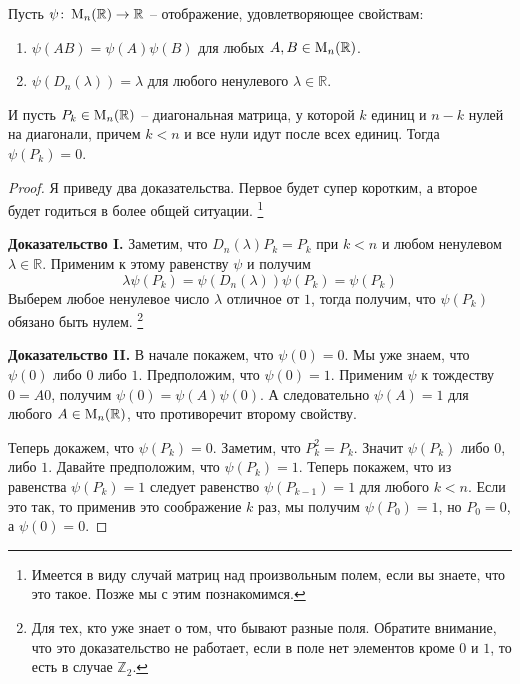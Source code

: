 \begin{claim}
\label{claim::MultiOnIdempotent}
Пусть $\psi\colon \operatorname{M}_{n}(\mathbb R)\to \mathbb R$ -- отображение, удовлетворяющее свойствам:
\begin{enumerate}
\item $\psi(AB) = \psi(A)\psi(B)$ для любых $A,B\in\operatorname{M}_{n}(\mathbb R)$.

\item $\psi(D_n(\lambda)) = \lambda$ для любого ненулевого $\lambda\in\mathbb R$.
\end{enumerate}
И пусть $P_k\in\operatorname{M}_{n}(\mathbb R)$ -- диагональная матрица, у которой $k$ единиц и $n-k$ нулей на диагонали, причем $k<n$ и все нули идут после всех единиц.
Тогда $\psi(P_k) = 0$.
\end{claim}
\begin{proof}
Я приведу два доказательства.
Первое будет супер коротким, а второе будет годиться в более общей ситуации.%
\footnote{Имеется в виду случай матриц над произвольным полем, если вы знаете, что это такое.
Позже мы с этим познакомимся.}

\noindent\textbf{Доказательство I.} Заметим, что $D_n(\lambda) P_k = P_k$ при $k < n$ и любом ненулевом $\lambda \in \mathbb R$.
Применим к этому равенству $\psi$ и получим
\[
\lambda \psi(P_k) = \psi(D_n(\lambda)) \psi(P_k) = \psi(P_k)
\]
Выберем любое ненулевое число $\lambda$ отличное от $1$, тогда получим, что $\psi(P_k)$ обязано быть нулем.%
\footnote{Для тех, кто уже знает о том, что бывают разные поля.
Обратите внимание, что это доказательство не работает, если в поле нет элементов кроме $0$ и $1$, то есть в случае $\mathbb Z_2$.}


\noindent\textbf{Доказательство II.} В начале покажем, что $\psi(0) = 0$.
Мы уже знаем, что $\psi(0)$ либо $0$ либо $1$.
Предположим, что $\psi(0)=1$.
Применим $\psi$ к тождеству $0 = A 0$, получим $\psi(0) = \psi(A)\psi(0)$.
А следовательно $\psi(A) = 1$ для любого $A\in\operatorname{M}_{n}(\mathbb R)$, что противоречит второму свойству.

Теперь докажем, что $\psi(P_k) = 0$.
Заметим, что $P_k^2 = P_k$.
Значит $\psi(P_k)$ либо $0$, либо $1$.
Давайте предположим, что $\psi(P_k) = 1$.
Теперь покажем, что из равенства $\psi(P_k) = 1$ следует равенство $\psi(P_{k-1}) = 1$ для любого $k < n$.
Если это так, то применив это соображение $k$ раз, мы получим $\psi(P_0) = 1$, но $P_0 = 0$, а $\psi(0) = 0$.


\end{proof}
